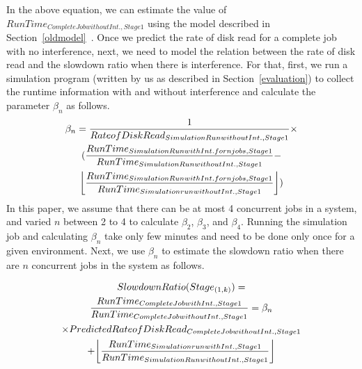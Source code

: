 \noindent
In the above equation, we can estimate the value of $RunTime_{Complete Job without Int., Stage 1}$ using the model described in Section~\ref{oldmodel}~\cite{wangperformance}. Once we predict the rate of disk read for a complete job with no interference, next, we need to model the relation between the rate of disk read and the slowdown ratio when there is interference. For that, first, we run a simulation program (written by us as described in Section~\ref{evaluation}) to collect the runtime information with and without interference and calculate the parameter $\beta_{n}$ as follows.
\begin{equation}
\label{beta}
\begin{gathered}
\beta_{n} = \frac{1}{Rate of Disk Read_{Simulation Run without Int., Stage 1}} \times \\
(\frac{RunTime_{Simulation Run with Int. for n jobs, Stage 1}}{RunTime_{Simulation Run without Int., Stage 1}} - \\
\floor*{\frac{RunTime_{Simulation Run with Int. for n jobs, Stage 1}}{RunTime_{Simulation run without Int., Stage 1}}})
\end{gathered}
\end{equation}
\noindent
In this paper, we assume that there can be at most 4 concurrent jobs in a system, and varied $n$ between 2 to 4 to calculate $\beta_{2}$, $\beta_{3}$, and $\beta_{4}$. Running the simulation job and calculating $\beta_{n}$ take only few minutes and need to be done only once for a given environment. Next, we use $\beta_{n}$ to estimate the slowdown ratio when there are $n$ concurrent jobs in the system as follows.

\begin{equation}
\label{slowdisk}
\begin{gathered}
SlowdownRatio(Stage_{(1,k)})=\\
\frac{RunTime_{Complete Job with Int., Stage 1}}{RunTime_{Complete Job without Int., Stage 1}} = \beta_{n} \\
\times PredictedRateofDiskRead_{Complete Job without Int., Stage 1} \\ + \floor*{\frac{Run Time_{Simulation run with Int., Stage 1}}{Run Time_{Simulation Run without Int., Stage 1}}}
\end{gathered}
\end{equation}




